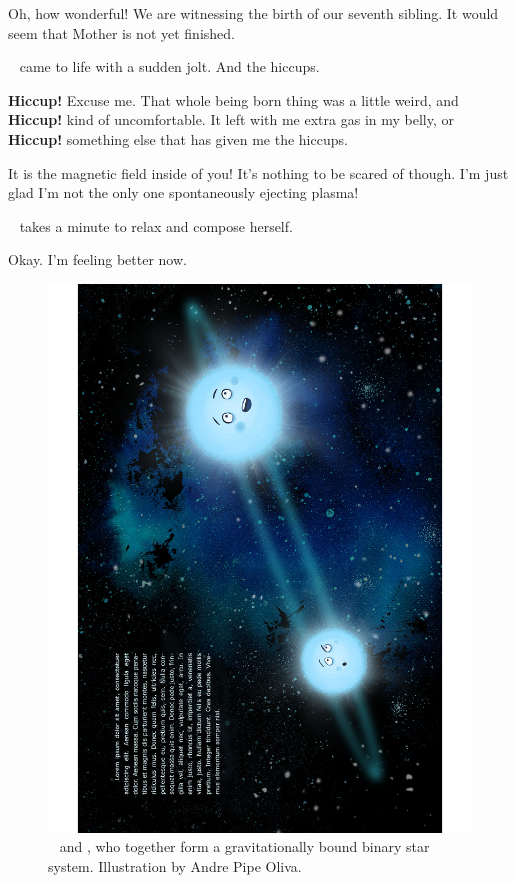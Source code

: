 \documentclass[main.tex]{subfiles}
\begin{document}
\par \Maia Oh, how wonderful!  We are witnessing the birth of our seventh sibling.  It would seem that Mother is not yet finished.

\par \nar \rmmerope~ came to life with a sudden jolt.  And the hiccups.  

\par \Merope \textbf{Hiccup!}  Excuse me.  That whole being born thing was a little weird, and \textbf{Hiccup!} kind of uncomfortable.  It left with me extra gas in my belly, or \textbf{Hiccup!} something else that has given me the hiccups.  

\par \Alcyone It is the magnetic field inside of you!  It's nothing to be scared of though.  I'm just glad I'm not the only one spontaneously ejecting plasma!

\par \nar \rmmerope~ takes a minute to relax and compose herself.

\par \Merope Okay.  I'm feeling better now.  

\begin{figure}
\includegraphics[width=\columnwidth,angle=270,origin=c]{ch1_1.pdf}
\caption{\rmmaia~ and \rmmerope, who together form a gravitationally bound binary star system.  Illustration by Andre Pipe Oliva.
\label{fig:fig1}}
\end{figure}
\end{document}
